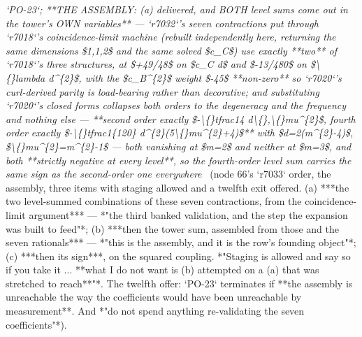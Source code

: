 \begin{description}
\textit{`PO-23`;  **THE ASSEMBLY: (a) delivered, and BOTH level sums come out in the tower's OWN variables** --- `r7032`'s seven contractions put through `r7018`'s coincidence-limit machine (rebuilt independently here, returning the same dimensions \$1,1,2\$ and the same solved \$c\_C\$) use exactly **two** of `r7018`'s three structures, at \$+49/48\$ on \$c\_C d\$ and \$-13/480\$ on \$\textbackslash\{\}lambda d\textasciicircum{}\{2\}\$, with the \$c\_B\textasciicircum{}\{2\}\$ weight \$-45\$ **non-zero** so `r7020`'s curl-derived parity is load-bearing rather than decorative; and substituting `r7020`'s closed forms collapses both orders to the degeneracy and the frequency and nothing else --- **second order exactly \$-\textbackslash\{\}tfrac14 d\textbackslash\{\},\textbackslash\{\}mu\textasciicircum{}\{2\}\$, fourth order exactly \$-\textbackslash\{\}tfrac1\{120\} d\textasciicircum{}\{2\}(5\textbackslash\{\}mu\textasciicircum{}\{2\}+4)\$** with \$d=2(m\textasciicircum{}\{2\}-4)\$, \$\textbackslash\{\}mu\textasciicircum{}\{2\}=m\textasciicircum{}\{2\}-1\$ --- both vanishing at \$m=2\$ and neither at \$m=3\$, and both **strictly negative at every level**, so the fourth-order level sum carries the same sign as the second-order one everywhere} \ (node 66's `r7033` order, the assembly, three items with staging allowed and a twelfth exit offered. (a) ***the two level-summed combinations of these seven contractions, from the coincidence-limit argument*** --- *"the third banked validation, and the step the expansion was built to feed"*; (b) ***then the tower sum, assembled from those and the seven rationals*** --- *"this is the assembly, and it is the row's founding object"*; (c) ***then its sign***, on the squared coupling.  *"Staging is allowed and say so if you take it ... **what I do not want is (b) attempted on a (a) that was stretched to reach**"*.  The twelfth offer: `PO-23` terminates if **the assembly is unreachable the way the coefficients would have been unreachable by measurement**.  And *"do not spend anything re-validating the seven coefficients"*). 

\end{description}
